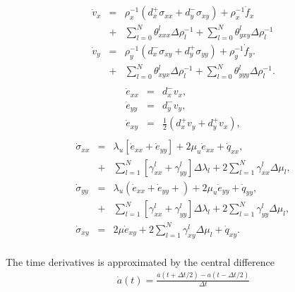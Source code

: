 \documentclass[11pt]{article}
\begin{document}
\begin{eqnarray}
  \dot{v}_x & = & \rho^{-1}_x\left(d^+_x \sigma_{xx} +d^-_y \sigma_{xy}\right) 
             +   \rho^{-1}_x \dot{f}_x                             \nonumber\\ 
            & + & \sum_{l=0}^N\theta^l_{xxx}\Delta\rho^{-1}_{l}
             +  \sum_{l=0}^N\theta^l_{yxy}\Delta\rho^{-1}_{l}      \nonumber\\
  \dot{v}_y & = & \rho^{-1}_y\left(d^-_x \sigma_{xy} +d^+_y \sigma_{yy}\right) 
             +   \rho^{-1}_y \dot{f}_y.                            \nonumber\\
            & + & \sum_{l=0}^N\theta^l_{xyx}\Delta\rho^{-1}_{l}
           +  \sum_{l=0}^N\theta^l_{yyy}\Delta\rho^{-1}_{l}.        \nonumber \\
\end{eqnarray}
\begin{eqnarray}
    \dot{e}_{xx} & = & d^-_x v_x, \nonumber \\
    \dot{e}_{yy} & = & d^-_y v_y, \nonumber \\
    \dot{e}_{xy} & = & \frac{1}{2}(d^+_x v_y + d^+_y v_x),\nonumber\\
                \label{eq:strains}
\end{eqnarray}
\begin{eqnarray}
  \dot{\sigma}_{xx} 
     & = & \lambda_u \left [\dot{e}_{xx} 
                 + \dot{e}_{yy} \right]
                 + 2\mu_u \dot{e}_{xx} +\dot{q}_{xx},           \nonumber\\ 
    & + & \sum_{l=1}^N\left[\gamma^l_{xx}
                           +\gamma^l_{yy}\right]\Delta\lambda_l
         + 2\sum_{l=1}^N\gamma^l_{xx}\Delta\mu_l,                \nonumber\\
  \dot{\sigma}_{yy} 
     & = & \lambda_u \left (\dot{e}_{xx} 
                 +\dot{e}_{yy} + \right)
                 + 2\mu_u \dot{e}_{yy} +\dot{q}_{yy},           \nonumber\\
    & + & \sum_{l=1}^N\left[\gamma^l_{xx}
                           +\gamma^l_{yy}\right]\Delta\lambda_l
         + 2\sum_{l=1}^N\gamma^l_{yy}\Delta\mu_l,                \nonumber\\
  \dot{\sigma}_{xy} 
  &  = &   2\mu \dot{e}_{xy} + 2\sum_{l=1}^N\gamma^l_{xy}
          \Delta\mu_l+\dot{q}_{xy}.                              \nonumber\\
\end{eqnarray}

The time derivatives is approximated by the central difference
\begin{eqnarray}
\dot{a}(t) = \frac{a(t+\Delta t/2) - a(t-\Delta t/2)}{\Delta t}
                      \label{eq:time-derivative}
\end{eqnarray}
\end{document}

